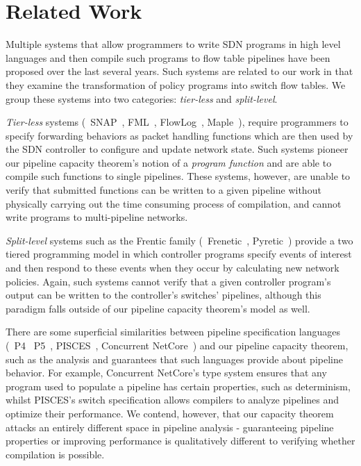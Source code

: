 \section{Related Work}\label{sec:related-work}
 Multiple systems that allow programmers to write SDN programs in high level languages and then compile such programs to flow table pipelines have been proposed over the last several years. Such systems are related to our work in that they examine the transformation of policy programs into switch flow tables. We group these systems into two categories: \textit{tier-less} and \textit{split-level}.

\textit{Tier-less} systems (\eg\ SNAP~\cite{SNAP}, FML~\cite{fml}, FlowLog~\cite{flowlog},  Maple~\cite{maple}), require programmers to specify forwarding behaviors as packet handling functions which are then used by the SDN controller to configure and update network state. Such systems pioneer our pipeline capacity theorem's notion of a \textit{program function} and are able to compile such functions to single pipelines. These systems, however, are unable to verify that submitted functions can be written to a given pipeline without physically carrying out the time consuming process of compilation, and cannot write programs to multi-pipeline networks.

\textit{Split-level} systems such as the Frentic family (\eg\ Frenetic~\cite{frenetic}, Pyretic~\cite{pyretic}) provide a two tiered programming model in which controller programs specify events of interest and then respond to these events when they occur by calculating new network policies. Again, such systems cannot verify that a given controller program's output can be written to the controller's switches' pipelines, although this paradigm falls outside of our pipeline capacity theorem's model as well.

 There are some superficial similarities between pipeline specification languages (\eg\ P4~\cite{P4} P5~\cite{Lee2017P5}, PISCES~\cite{PISCES}, Concurrent NetCore~\cite{ConcurrentNetCore}) and our pipeline capacity theorem, such as the analysis and guarantees that such languages provide about pipeline behavior. For example, Concurrent NetCore's type system ensures that any program used to populate a pipeline has certain properties, such as determinism, whilst PISCES's switch specification allows compilers to analyze pipelines and optimize their performance. We contend, however, that our capacity theorem attacks an entirely different space in pipeline analysis - guaranteeing pipeline properties or improving performance is qualitatively different to verifying whether compilation is possible.

